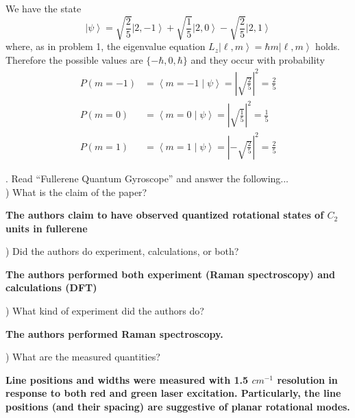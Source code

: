 \documentclass[a4paper, 11pt]{article}
\newcommand{\ket}[1]{\ensuremath{\left|#1\right\rangle}}
\newcommand{\bracket}[2]{\ensuremath{\left\langle #1 \middle| #2 \right\rangle}}
\newenvironment{solution}{%
	\begin{list}{}{%
			\setlength{\topsep}{0pt}%
			\setlength{\leftmargin}{1.5cm}%
			\setlength{\rightmargin}{1.5cm}%
			\setlength{\listparindent}{\parindent}%
			\setlength{\itemindent}{\parindent}%
			\setlength{\parsep}{\parskip}%
		}%
		\item[]}{\end{list}}
\begin{document}
\begin{solution}
  \noindent We have the state
  \begin{equation*}
    \ket{\psi} = \sqrt{\frac{2}{5}}\ket{2,-1} + \sqrt{\frac{1}{5}}\ket{2,0}-\sqrt{\frac{2}{5}}\ket{2,1} 
  \end{equation*}
  where, as in problem 1, the eigenvalue equation $L_z\ket{\ell,m}= \hbar m \ket{\ell,m}$ holds. Therefore the possible values are $\{-\hbar, 0, \hbar\}$ and they occur with probability
  \begin{align*}
    P(m=-1) &= \bracket{m=-1}{\psi} = \left| \sqrt{\frac{2}{5}}\right|^2 = \frac{2}{5}\\
    P(m=0) &= \bracket{m=0}{\psi} = \left| \sqrt{\frac{1}{5}}\right|^2 = \frac{1}{5}\\
    P(m=1) &= \bracket{m=1}{\psi} = \left| -\sqrt{\frac{2}{5}}\right|^2 = \frac{2}{5}
  \end{align*}

\end{solution}

. Read ``Fullerene Quantum Gyroscope'' and answer the following...\\

) What is the claim of the paper?\\
\begin{solution}\noindent\textbf{The authors claim to have observed quantized rotational states of $C_2$ units in fullerene\\}\end{solution}

) Did the authors do experiment, calculations, or both?\\
\begin{solution}\noindent\textbf{The authors performed both experiment (Raman spectroscopy) and calculations (DFT) }\\\end{solution}

) What kind of experiment did the authors do? \\ 
\begin{solution}\noindent\textbf{The authors performed Raman spectroscopy.\\}\end{solution}
) What are the measured quantities?\\
\begin{solution}\noindent\textbf{Line positions and widths were measured with 1.5 $cm^{-1}$ resolution in response to both red and green laser excitation. Particularly, the line positions (and their spacing) are suggestive of planar rotational modes.\\}\end{solution}
\end{document}

